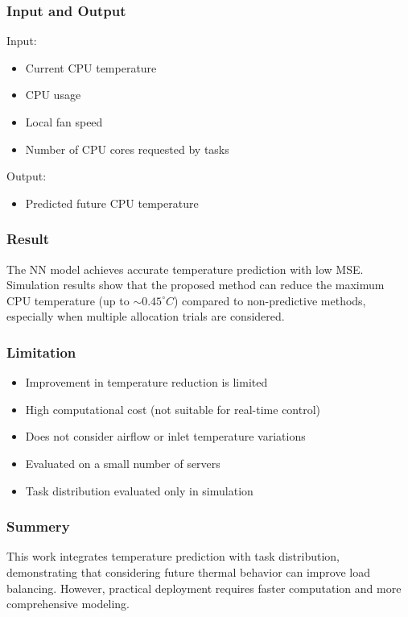\documentclass[12pt,a4paper]{article}
\begin{document}
    \subsubsection{Input and Output}
                    Input:
                \begin{itemize}
                    \item Current CPU temperature
                    \item CPU usage
                    \item Local fan speed
                    \item Number of CPU cores requested by tasks
                \end{itemize}
                
                Output:
                \begin{itemize}
                    \item Predicted future CPU temperature
                \end{itemize}
                
    \subsubsection{Result}
    The NN model achieves accurate temperature prediction with low MSE. Simulation results show that the proposed method can reduce the maximum CPU temperature (up to $\sim 0.45^\circ C$) compared to non-predictive methods, especially when multiple allocation trials are considered.

    \subsubsection{Limitation}
                \begin{itemize}
                \item Improvement in temperature reduction is limited
                \item High computational cost (not suitable for real-time control)
                \item Does not consider airflow or inlet temperature variations
                \item Evaluated on a small number of servers
                \item Task distribution evaluated only in simulation
                \end{itemize}
                
    \subsubsection{Summery}
    This work integrates temperature prediction with task distribution, demonstrating that considering future thermal behavior can improve load balancing. However, practical deployment requires faster computation and more comprehensive modeling.
\end{document}
